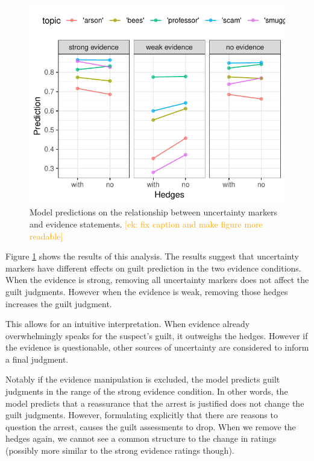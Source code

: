 \documentclass[11pt,a4paper]{article}
\newcommand{\ek}[1]{\textcolor{Orange}{[ek: #1]}}
\begin{document}
\begin{figure}
	\includegraphics[width=\linewidth]{graphs/hedges.pdf}
	\caption{Model predictions on the relationship between uncertainty markers and evidence statements. \ek{fix caption and make figure more readable}}
	\label{fig:hedges}
\end{figure}

Figure \ref{fig:hedges} shows the results of this analysis. The results suggest that uncertainty markers have different effects on guilt prediction in the two evidence conditions. When the evidence is strong, removing all uncertainty markers does not affect the guilt judgments. However when the evidence is weak, removing those hedges increases the guilt judgment.

This allows for an intuitive interpretation. When evidence already overwhelmingly speaks for the suspect's guilt, it outweighs the hedges. However if the evidence is questionable, other sources of uncertainty are considered to inform a final judgment.

Notably if the evidence manipulation is excluded, the model predicts guilt judgments in the range of the strong evidence condition. In other words, the model predicts that a reassurance that the arrest is justified does not change the guilt judgments. However, formulating explicitly that there are reasons to question the arrest, causes the guilt assessments to drop.
When we remove the hedges again, we cannot see a common structure to the change in ratings (possibly more similar to the strong evidence ratings though).
\end{document}
